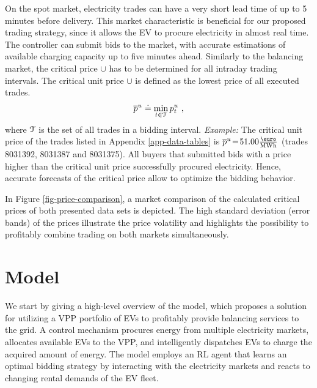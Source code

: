 \documentclass[a4paper, 12pt]{article}
\begin{document}
On the spot market, electricity trades can have a very short lead time of up to
5 minutes before delivery. This market characteristic is beneficial for our
proposed trading strategy, since it allows the EV to procure electricity in
almost real time. The controller can submit bids to the market, with accurate
estimations of available charging capacity up to five minutes ahead. Similarly
to the balancing market, the critical price \(\cup{}\) has to be determined for
all intraday trading intervals. The critical unit price \(\cup{}\) is defined as
the lowest price of all executed trades.
\begin{equation*}
    \overline p^u_{} \doteq \min_{t \in \cal{T}} p^u_{t} \text{ ,}
\end{equation*}
where \(\cal{T}\) is the set of all trades in a bidding interval. \emph{Example:} The
critical unit price of the trades listed in Appendix \ref{app-data-tables} is
\(\cup{} \!=\!51.00 \emwh\) (trades 8031392, 8031387 and 8031375). All buyers that
submitted bids with a price higher than the critical unit price successfully
procured electricity. Hence, accurate forecasts of the critical price allow to
optimize the bidding behavior.

In Figure \ref{fig-price-comparison}, a market comparison of the calculated
critical prices of both presented data sets is depicted. The high standard
deviation (error bands) of the prices illustrate the price volatility and
highlights the possibility to profitably combine trading on both markets
simultaneously.

\clearpage

\section{Model}
\label{sec:orgf920744}
We start by giving a high-level overview of the model, which proposes a solution
for utilizing a VPP portfolio of EVs to profitably provide balancing services to
the grid. A control mechanism procures energy from multiple electricity markets,
allocates available EVs to the VPP, and intelligently dispatches EVs to charge
the acquired amount of energy. The model employs an RL agent that learns an
optimal bidding strategy by interacting with the electricity markets and reacts
to changing rental demands of the EV fleet.
\end{document}
